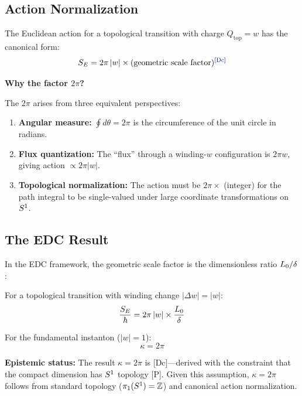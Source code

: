 \subsection{Action Normalization}

The Euclidean action for a topological transition with charge $Q_{\text{top}} = w$
has the canonical form:
\begin{equation}
    \SE = 2\pi \, |w| \times (\text{geometric scale factor})
    \label{eq:SE_canonical}
    \tagDc
\end{equation}

\textbf{Why the factor $2\pi$?}

The $2\pi$ arises from three equivalent perspectives:
\begin{enumerate}
    \item \textbf{Angular measure:} $\oint d\theta = 2\pi$ is the circumference
          of the unit circle in radians.
    \item \textbf{Flux quantization:} The ``flux'' through a winding-$w$
          configuration is $2\pi w$, giving action $\propto 2\pi |w|$.
    \item \textbf{Topological normalization:} The action must be $2\pi \times$
          (integer) for the path integral to be single-valued under large
          coordinate transformations on $S^1$.
\end{enumerate}

\subsection{The EDC Result}

In the EDC framework, the geometric scale factor is the dimensionless ratio
$L_0/\delta$:

\begin{resultbox}[title=Topological Factor $\kappa$]
    For a topological transition with winding change $|\Delta w| = |w|$:
    \begin{equation}
        \frac{S_E}{\hbar} = 2\pi \, |w| \times \frac{L_0}{\delta}
        \label{eq:SE_full}
    \end{equation}

    For the fundamental instanton ($|w| = 1$):
    \begin{equation}
        \boxed{\kappa = 2\pi}
        \label{eq:kappa_result}
    \end{equation}
    \tagDc
\end{resultbox}

\textbf{Epistemic status:} The result $\kappa = 2\pi$ is [Dc]---derived with
the constraint that the compact dimension has $S^1$ topology [P]. Given this
assumption, $\kappa = 2\pi$ follows from standard topology ($\pi_1(S^1) = \mathbb{Z}$)
and canonical action normalization.

